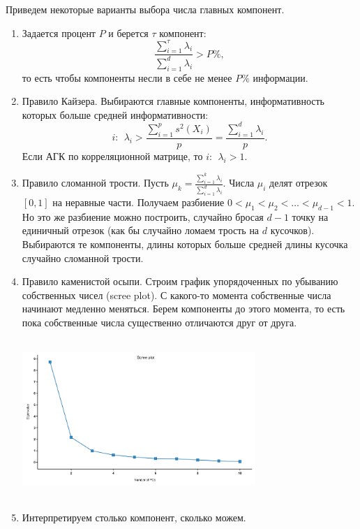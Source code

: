 \documentclass[specialist, 12pt,
subf, %
href, colorlinks=true,
substylefile = spbu.rtx,
]{disser}
\begin{document}
Приведем некоторые варианты выбора числа главных компонент.

\begin{enumerate}
\item Задается процент $P$ и берется $\tau$ компонент:
\begin{equation*}
\frac{\sum\limits_{i=1}^\tau \lambda_i}{\sum\limits_{i=1}^d \lambda_i} > P\%,
\end{equation*}
то есть чтобы компоненты несли в себе не менее $P\%$ информации.

\item Правило Кайзера.
Выбираются главные компоненты, информативность которых больше средней информативности:
\begin{equation*}
i:~~\lambda_i>\frac{\sum\limits_{i=1}^p s^2(X_i)}{p} = \frac{\sum\limits_{i=1}^d \lambda_i}{p}.
\end{equation*}
Если АГК по корреляционной матрице, то $i:~~\lambda_i>1$.

\item Правило сломанной трости. Пусть $\mu_k = \frac{\sum\limits_{i=1}^k \lambda_i}{\sum\limits_{i=1}^d \lambda_i}$. Числа $\mu_i$ делят отрезок $[0,1]$ на неравные части. Получаем разбиение $0<\mu_1<\mu_2<\ldots<\mu_{d-1}<1$. Но это же разбиение можно построить, случайно бросая $d-1$ точку на единичный отрезок (как бы случайно ломаем трость на $d$ кусочков). Выбираются те компоненты, длины которых больше средней длины кусочка случайно сломанной трости.

\item Правило каменистой осыпи. Строим график упорядоченных по убыванию собственных чисел (scree plot). С какого-то момента собственные числа начинают медленно меняться. Берем компоненты до этого момента, то есть пока собственные числа существенно отличаются друг от друга.

	\begin{center}
	\begin{minipage}{0.51\linewidth}
		\centering
		\includegraphics[width=250pt, height=170pt]{Scree}
	\end{minipage}
\end{center}

\item Интерпретируем столько компонент, сколько можем.
\end{enumerate}
\end{document}
